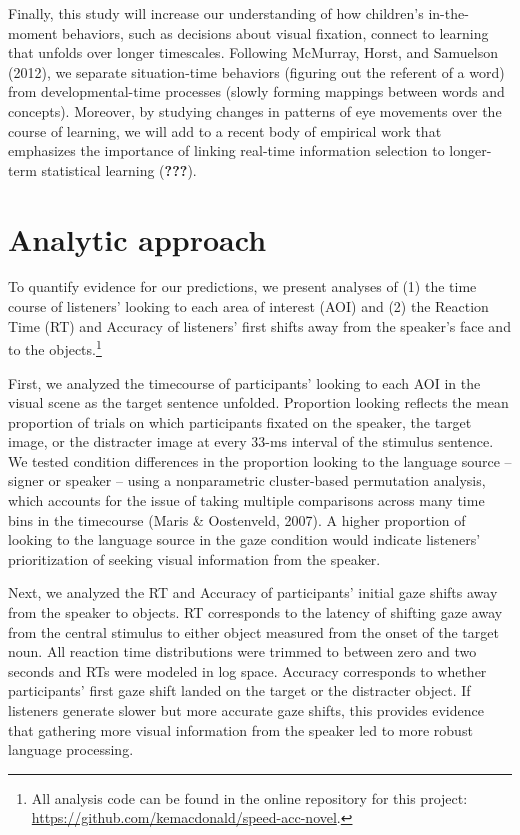 \documentclass[man,floatsintext]{apa6}
\let\rmarkdownfootnote\footnote%
\def\footnote{\protect\rmarkdownfootnote}
\begin{document}
Finally, this study will increase our understanding of how children's
in-the-moment behaviors, such as decisions about visual fixation,
connect to learning that unfolds over longer timescales. Following
McMurray, Horst, and Samuelson (2012), we separate situation-time
behaviors (figuring out the referent of a word) from developmental-time
processes (slowly forming mappings between words and concepts).
Moreover, by studying changes in patterns of eye movements over the
course of learning, we will add to a recent body of empirical work that
emphasizes the importance of linking real-time information selection to
longer-term statistical learning ({\textbf{???}}).

\section{Analytic approach}\label{analytic-approach}

To quantify evidence for our predictions, we present analyses of (1) the
time course of listeners' looking to each area of interest (AOI) and (2)
the Reaction Time (RT) and Accuracy of listeners' first shifts away from
the speaker's face and to the objects.\footnote{All analysis code can be
  found in the online repository for this project:
  \url{https://github.com/kemacdonald/speed-acc-novel}.}

First, we analyzed the timecourse of participants' looking to each AOI
in the visual scene as the target sentence unfolded. Proportion looking
reflects the mean proportion of trials on which participants fixated on
the speaker, the target image, or the distracter image at every 33-ms
interval of the stimulus sentence. We tested condition differences in
the proportion looking to the language source -- signer or speaker --
using a nonparametric cluster-based permutation analysis, which accounts
for the issue of taking multiple comparisons across many time bins in
the timecourse (Maris \& Oostenveld, 2007). A higher proportion of
looking to the language source in the gaze condition would indicate
listeners' prioritization of seeking visual information from the
speaker.

Next, we analyzed the RT and Accuracy of participants' initial gaze
shifts away from the speaker to objects. RT corresponds to the latency
of shifting gaze away from the central stimulus to either object
measured from the onset of the target noun. All reaction time
distributions were trimmed to between zero and two seconds and RTs were
modeled in log space. Accuracy corresponds to whether participants'
first gaze shift landed on the target or the distracter object. If
listeners generate slower but more accurate gaze shifts, this provides
evidence that gathering more visual information from the speaker led to
more robust language processing.
\end{document}
